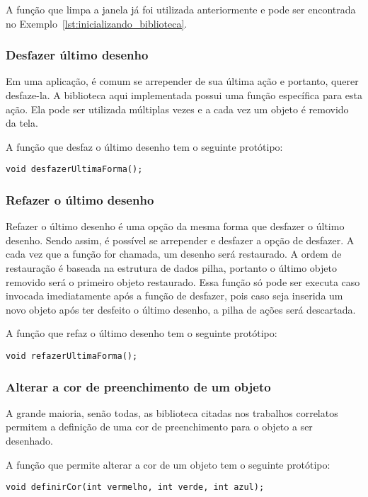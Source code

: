 \documentclass[12pt, %
openright,
oneside, %
a4paper,    %
brazil]{facom-ufu-abntex2}
\begin{document}
A função que limpa a janela já foi utilizada anteriormente e pode ser encontrada no Exemplo~\ref{lst:inicializando_biblioteca}.

\subsubsection{Desfazer último desenho}
Em uma aplicação, é comum se arrepender de sua última ação e portanto, querer desfaze-la. A biblioteca aqui implementada possui uma função específica para esta ação. Ela pode ser utilizada múltiplas vezes e a cada vez um objeto é removido da tela.

A função que desfaz o último desenho tem o seguinte protótipo:

\begin{verbatim}
void desfazerUltimaForma();
\end{verbatim}

\subsubsection{Refazer o último desenho}
Refazer o último desenho é uma opção da mesma forma que desfazer o último desenho. Sendo assim, é possível se arrepender e desfazer a opção de desfazer. A cada vez que a função for chamada, um desenho será restaurado. A ordem de restauração é baseada na estrutura de dados pilha, portanto o último objeto removido será o primeiro objeto restaurado. Essa função só pode ser executa caso invocada imediatamente após a função de desfazer, pois caso seja inserida um novo objeto após ter desfeito o último desenho, a pilha de ações será descartada.

A função que refaz o último desenho tem o seguinte protótipo:

\begin{verbatim}
void refazerUltimaForma();
\end{verbatim}

\subsubsection{Alterar a cor de preenchimento de um objeto} \label{api_definirCor}
A grande maioria, senão todas, as biblioteca citadas nos trabalhos correlatos permitem a definição de uma cor de preenchimento para o objeto a ser desenhado.

A função que permite alterar a cor de um objeto tem o seguinte protótipo:

\begin{verbatim}
void definirCor(int vermelho, int verde, int azul);
\end{verbatim}
\end{document}

